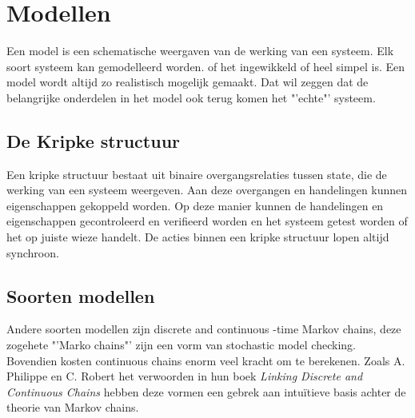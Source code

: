 \documentclass{article}%
\begin{document}
\section{Modellen}
Een model is een schematische weergaven van de werking van een systeem. Elk soort systeem kan gemodelleerd worden. of het ingewikkeld of heel simpel is. Een model wordt altijd zo realistisch mogelijk gemaakt. Dat wil zeggen dat de belangrijke onderdelen in het model ook terug komen het "'echte"' systeem.

\subsection{De Kripke structuur}
Een kripke structuur bestaat uit binaire overgangsrelaties tussen state, die de werking van een systeem weergeven.\cite{kripkestructure} Aan deze overgangen en handelingen kunnen eigenschappen gekoppeld worden. Op deze manier kunnen de handelingen en eigenschappen gecontroleerd en verifieerd worden en het systeem getest worden of het op juiste wieze handelt. De acties binnen een kripke structuur lopen altijd synchroon.


\subsection{Soorten modellen} %
Andere soorten modellen zijn discrete and continuous -time Markov chains, deze zogehete "'Marko chains"' zijn een vorm van stochastic model checking. Bovendien kosten continuous chains enorm veel kracht om te berekenen. Zoals A. Philippe en C. Robert het verwoorden in hun boek \textit{Linking Discrete and Continuous Chains}\cite{linkingchains} hebben deze vormen een gebrek aan intuïtieve basis achter de theorie van Markov chains.
\end{document}
